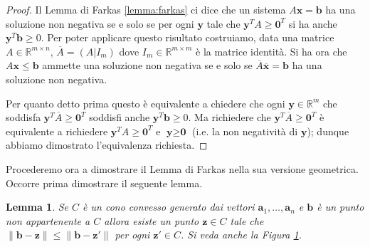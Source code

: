 \documentclass[italian, letter paper, 12pt, reqno]{article}
\theoremstyle{myteo}
\newtheorem{lemma}[theorem]{Lemma}
\numberwithin{equation}{section}
\begin{document}
\begin{proof}
  Il Lemma di Farkas \ref{lemma:farkas} ci dice che un sistema \(A \textbf{x}= \textbf{b}\) ha una soluzione non negativa se e solo se per ogni \(\textbf{y}\) tale che \(\textbf{y}^TA \geq \textbf{0}^T\) si ha anche \(\textbf{y}^T \textbf{b} \geq 0\).
  Per poter applicare questo risultato costruiamo, data una matrice \(A\in \mathbb{R}^{m\times n}\), \(\overline{A}= (A|I_m)\) dove \(I_m\in \mathbb{R}^{m\times m}\) è la matrice identità.
  Si ha ora che \(A \textbf{x} \leq \textbf{b}\) ammette una soluzione non negativa se e solo se \(\overline{A} \mathbf{\overline{x}} = \textbf{b}\) ha una soluzione non negativa.

  Per quanto detto prima questo è equivalente a chiedere che ogni \(\textbf{y}\in \mathbb{R}^m\) che soddisfa \(\mathbf{y}^T\overline{A} \geq \textbf{0}^T\) soddisfi anche \(\mathbf{y}^T \textbf{b} \geq 0\).
  Ma richiedere che \(\textbf{y}^T\overline{A} \geq \textbf{0}^T\) è equivalente a richiedere \(\textbf{y}^TA \geq \textbf{0}^T\) e \(\textbf{y} \geq \textbf{0}\) (i.e. la non negatività di \(\textbf{y}\)); dunque abbiamo dimostrato l'equivalenza richiesta.
\end{proof}

Procederemo ora a dimostrare il Lemma di Farkas nella sua versione geometrica.
Occorre prima dimostrare il seguente lemma.

\begin{lemma}
  \label{lemma:punto_vicino}
  Se \(C\) è un cono convesso generato dai vettori \(\mathbf{a}_1,\ldots,\mathbf{a}_n\) e \(\mathbf{b}\) è un punto non appartenente a \(C\) allora esiste un punto \(\mathbf{z}\in C\) tale che \(\|\mathbf{b} - \mathbf{z}\| \le \|\mathbf{b} - \mathbf{z}'\|\) per ogni \(\mathbf{z}'\in C\).
  Si veda anche la Figura \ref{fig:punto_vicino}.
\end{lemma}

\begin{figure}[h]
  \begin{center}
    \hspace{1cm}
  \end{center}
  \caption{}
  \label{fig:punto_vicino}
\end{figure}
\end{document}
